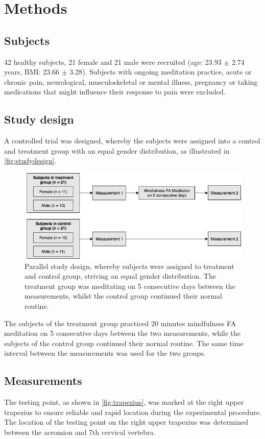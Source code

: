 \section{Methods}
\subsection{Subjects}
42 healthy subjects, 21 female and 21 male were recruited (age: 23.93 $\pm$ 2.74 years, BMI: 23.66 $\pm$ 3.28). Subjects with ongoing meditation practice, acute or chronic pain, neurological, musculoskeletal or mental illness, pregnancy or taking medications that might influence their response to pain were excluded.

\subsection{Study design}
A controlled trial was designed, whereby the subjects were assigned into a control and treatment group with an equal gender distribution, as illustrated in \autoref{fig:studydesign}.

\begin{figure}[H]
\centering
\includegraphics[width=1\columnwidth]{../figures/studydesign.png}
\caption{Parallel study design, whereby subjects were assigned to treatment and control group, striving an equal gender distribution. The treatment group was meditating on 5 consecutive days between the measurements, whilst the control group continued their normal routine.}
\label{fig:studydesign}
\end{figure} 

\noindent 
The subjects of the treatment group practiced 20 minutes mindfulness FA meditation on 5 consecutive days between the two measurements, while the subjects of the control group continued their normal routine. The same time interval between the measurements was used for the two groups.

\subsection{Measurements}%
The testing point, as shown in \autoref{fig:trapezius}, was marked at the right upper trapezius to ensure reliable and rapid location during the experimental procedure. The location of the testing point on the right upper trapezius was determined between the acromion and 7th cervical vertebra. 

